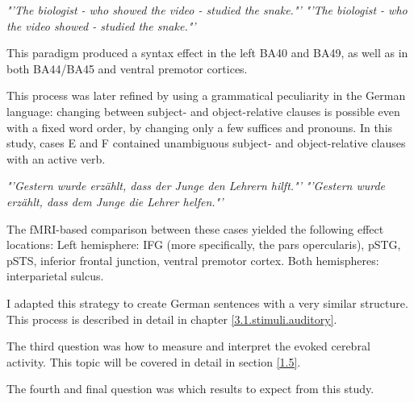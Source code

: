 \begin{center}
\emph{"'The biologist - who showed the video - studied the snake."'}
\emph{"'The biologist - who the video showed - studied the snake."'}
\end{center}


This paradigm produced a syntax effect in the left BA40 and BA49, as well as in both BA44/BA45 and ventral premotor cortices.

This process was later refined \cite{1.3.Bornkessel} by using a grammatical peculiarity in the German language: changing between subject- and object-relative clauses is possible even with a fixed word order, by changing only a few suffices and pronouns.
In this study, cases E and F contained unambiguous subject- and object-relative clauses with an active verb.


\begin{center}
\emph{"'Gestern wurde erzählt, dass der Junge den Lehrern hilft."'}
\emph{"'Gestern wurde erzählt, dass dem Junge die Lehrer helfen."'}
\end{center}


The fMRI-based comparison between these cases yielded the following effect locations:
Left hemisphere: IFG (more specifically, the pars opercularis), pSTG, pSTS, inferior frontal junction, ventral premotor cortex.
Both hemispheres: interparietal sulcus.

I adapted this strategy to create German sentences with a very similar structure.
This process is described in detail in chapter \ref{3.1.stimuli.auditory}.


The third question was how to measure and interpret the evoked cerebral activity.
This topic will be covered in detail in section \ref{1.5}.


The fourth and final question was which results to expect from this study.
